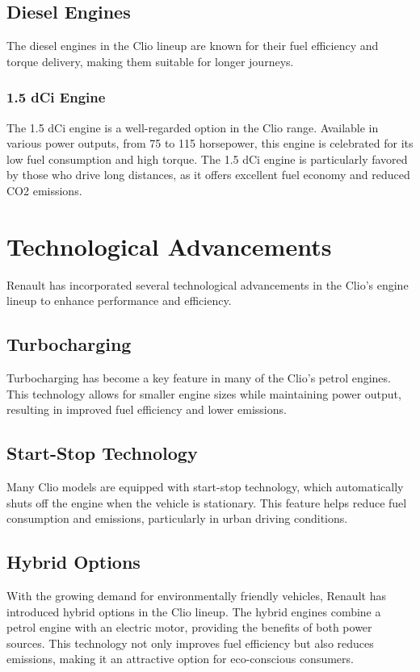 \documentclass{article}
\begin{document}
\subsection{Diesel Engines}
The diesel engines in the Clio lineup are known for their fuel efficiency and torque delivery, making them suitable for longer journeys.

\subsubsection{1.5 dCi Engine}
The 1.5 dCi engine is a well-regarded option in the Clio range. Available in various power outputs, from 75 to 115 horsepower, this engine is celebrated for its low fuel consumption and high torque. The 1.5 dCi engine is particularly favored by those who drive long distances, as it offers excellent fuel economy and reduced CO2 emissions.

\section{Technological Advancements}
Renault has incorporated several technological advancements in the Clio's engine lineup to enhance performance and efficiency.

\subsection{Turbocharging}
Turbocharging has become a key feature in many of the Clio's petrol engines. This technology allows for smaller engine sizes while maintaining power output, resulting in improved fuel efficiency and lower emissions.

\subsection{Start-Stop Technology}
Many Clio models are equipped with start-stop technology, which automatically shuts off the engine when the vehicle is stationary. This feature helps reduce fuel consumption and emissions, particularly in urban driving conditions.

\subsection{Hybrid Options}
With the growing demand for environmentally friendly vehicles, Renault has introduced hybrid options in the Clio lineup. The hybrid engines combine a petrol engine with an electric motor, providing the benefits of both power sources. This technology not only improves fuel efficiency but also reduces emissions, making it an attractive option for eco-conscious consumers.
\end{document}
